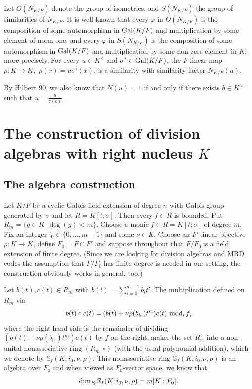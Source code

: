 \documentclass[12pt]{amsart}
\theoremstyle{plain}
\theoremstyle{definition}
\numberwithin{equation}{section}
\numberwithin{figure}{section}
\begin{document}
  Let $O(N_{K/F})$ denote the group of isometries, and $S(N_{K/F})$ the group of similarities of $N_{K/F}$. It is well-known that every $\varphi$ in  $O(N_{K/F})$ is the composition of some automorphism in ${\rm Gal}(K/F)$ and multiplication by some element of norm one, and  every $\varphi$ in  $S(N_{K/F})$ is the composition of some automorphism in ${\rm Gal}(K/F)$ and multiplication by some non-zero element in $K$; more precisely, For every $u\in K^\times$ and $\sigma^i\in {\rm Gal}(K/F)$, the $F$-linear map $\rho:K\to K,$ $\rho(x)=u \sigma^i(x)$, is a similarity with similarity factor $N_{K/F}(u)$.






 By Hilbert 90, we also know that $N(u)=1$ if and only if there exists $b\in K^\times$ such that $u=\frac{b}{\sigma(b)}$.


\section{The construction of division algebras with right nucleus $K$}\label{sec:3}

\subsection{The algebra construction}

Let $K/F$ be a cyclic Galois field extension of degree $n$ with Galois group generated by $\sigma$ and let $R=K[t;\sigma]$.  Then every $f\in R$ is bounded. Put $R_m=\{ g\in R\,|\, \deg(g)<m \}$. Choose a monic $f\in R=K[t;\sigma]$  of degree $m$. Fix an integer $i_0\in \{0,\dots, m-1\}$ and  some $\nu\in K$. Choose an $F'$-linear bijective $\rho:K\to K$, define  $F_0=F\cap F'$ and suppose throughout  that $F/F_0$ is a field extension of finite degree. (Since we are looking for division algebras and MRD codes the assumption that $F/F_0$ has finite degree is needed in our setting, the construction obviously works in general, too.)


Let $b(t), c(t)\in R_m$ with  $b(t)=\sum_{i=0}^{m-1} b_it^i $. The multiplication defined on $R_m$ via
$$b(t)\circ c(t)= (b(t)+\nu\rho(b_{i_0})t^m )c(t)\,\,{\rm mod}_r f,$$
where the right hand side is the remainder of dividing $(b(t)+\nu\rho(b_{i_0})t^m )c(t)$ by $f$ on the right,
makes the set $R_m$ into a non-unital nonassociative ring $(R_m,\circ)$ (with the usual polynomial addition),
which we denote by  $\mathbb{S}_f(K,i_0,\nu,\rho)$.  This nonassociative ring  $\mathbb{S}_f(K,i_0,\nu,\rho)$ is an algebra over $F_0$
and when viewed as $F_0$-vector space, we know that
$${\rm dim}_{F_0} \mathbb{S}_f(K,i_0,\nu,\rho)=m[K:F_0].$$
\end{document}
